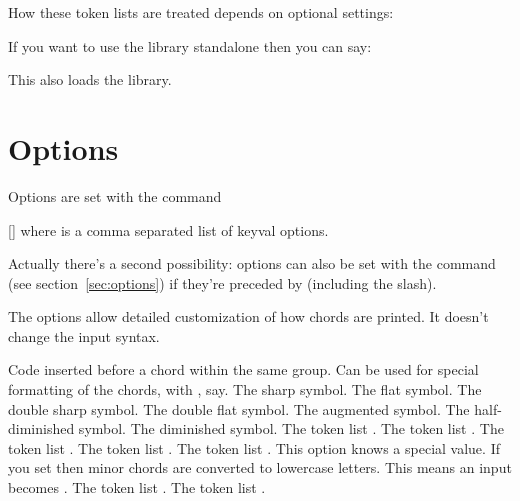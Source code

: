 \documentclass[load-preamble+]{cnltx-doc}
\begin{document}
How these token lists are treated depends on optional settings:

\begin{example}
   
   
\end{example}

If you want to use the library standalone then you can say:
\begin{sourcecode}
  \usepackage[minimal]{leadsheets}
\end{sourcecode}
This also loads the \musicsymbols{} library.

\section{Options}

Options are set with the command
\begin{commands}
  []
    where  is a comma separated list of keyval options.
\end{commands}
Actually there's a second possibility: options can also be set with the
command  (see section~\ref{sec:options}) if they're preceded
by  (including the slash).

The options allow detailed customization of how chords are printed.  It
doesn't change the input syntax.

\begin{options}
  \Default
    Code inserted before a chord within the same group. Can be used for
    special formatting of the chords, with , say.
    The sharp symbol.
    The flat symbol.
    The double sharp symbol.
    The double flat symbol.
  \Default{+}
    The augmented symbol.
    The half-diminished symbol.
    The diminished symbol.
    The token list .
    The token list .
    The token list .
  \Default
    The token list .
    The token list .  This option knows a special value.  If you set
     then minor chords are converted to lowercase
    letters.  This means an input  becomes .
    The token list .
    The token list .
\end{options}
\end{document}
